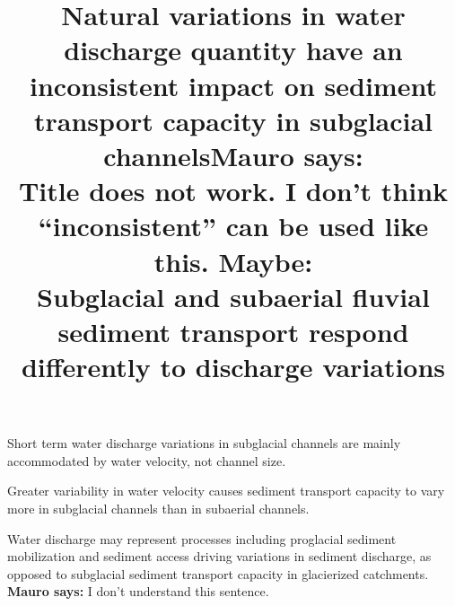 \documentclass[draft]{agujournal2019}
\newcommand{\mauro}[1]{{\textbf{\color{green}Mauro says:} \color{green} #1} }
\begin{document}
\title{Natural variations in water discharge quantity have an inconsistent impact on sediment transport capacity in subglacial channels\mauro{\\Title does not work.  I don't think ``inconsistent'' can be used like this. Maybe:}\\
Subglacial and subaerial fluvial sediment transport respond differently to discharge variations
}






\begin{keypoints}
\item Short term water discharge variations in subglacial channels are mainly accommodated by water velocity, not channel size.
\item Greater variability in water velocity causes sediment transport capacity to vary more in subglacial channels than in subaerial channels.
\item Water discharge may represent processes including proglacial sediment mobilization and sediment access driving variations in sediment discharge, as opposed to subglacial sediment transport capacity in glacierized catchments. \mauro{I don't understand this sentence.}
\end{keypoints}
\end{document}

